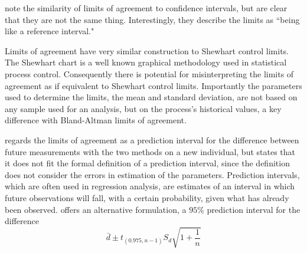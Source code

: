 \documentclass{report}
\begin{document}
	\citet{BA99} note the similarity of limits of agreement to
	confidence intervals, but are clear that they are not the same
	thing. Interestingly, they describe the limits as ``being like a
	reference interval."
	
	Limits of agreement have very similar construction to Shewhart
	control limits. The Shewhart chart is a well known graphical
	methodology used in statistical process control. Consequently
	there is potential for misinterpreting the limits of agreement as
	if equivalent to Shewhart control limits. Importantly the
	parameters used to determine the limits, the mean and standard
	deviation, are not based on any sample used for an analysis, but
	on the process's historical values, a key difference with
	Bland-Altman limits of agreement.
	
	\citet{BXC2008} regards the limits of agreement as a prediction
	interval for the difference between future measurements with the
	two methods on a new individual, but states that it does not fit
	the formal definition of a prediction interval, since the
	definition does not consider the errors in estimation of the
	parameters. Prediction intervals, which are often used in
	regression analysis, are estimates of an interval in which future
	observations will fall, with a certain probability, given what has
	already been observed. \citet{BXC2008} offers an alternative
	formulation, a $95\%$ prediction interval for the difference
	\begin{equation}
	\bar{d} \pm t_{(0.975, n-1)}S_{d} \sqrt{1+\frac{1}{n}}
	\end{equation}
	
\end{document}
